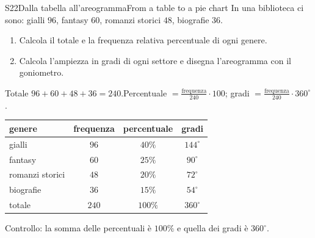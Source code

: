 \begin{esercizio}{S2}{2}{Dalla tabella all'areogramma}{From a table to a pie chart}
In una biblioteca ci sono: gialli $96$, fantasy $60$, romanzi storici $48$, biografie $36$.
\begin{enumerate}
\item Calcola il totale e la frequenza relativa percentuale di ogni genere.
\item Calcola l'ampiezza in gradi di ogni settore e disegna l'areogramma con il goniometro.
\end{enumerate}
\end{esercizio}
\begin{solbox}
Totale $96+60+48+36=240$.\quad Percentuale $=\frac{\text{frequenza}}{240}\cdot100$; \quad gradi $=\frac{\text{frequenza}}{240}\cdot360^\circ$.
\begin{center}
\begin{tabular}{@{}lccc@{}}
\toprule
genere & frequenza & percentuale & gradi\\
\midrule
gialli & $96$ & $40\%$ & $144^\circ$\\
fantasy & $60$ & $25\%$ & $90^\circ$\\
romanzi storici & $48$ & $20\%$ & $72^\circ$\\
biografie & $36$ & $15\%$ & $54^\circ$\\
\midrule
totale & $240$ & $100\%$ & $360^\circ$\\
\bottomrule
\end{tabular}
\hspace{1cm}
\end{center}
Controllo: la somma delle percentuali è $100\%$ e quella dei gradi è $360^\circ$. 
\end{solbox}

